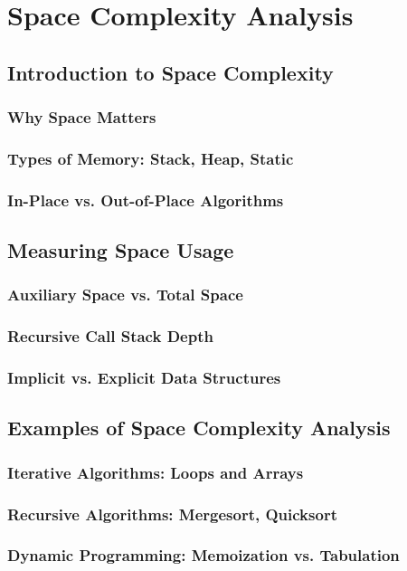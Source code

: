 
\chapter{Space Complexity Analysis}
\section{Introduction to Space Complexity}
\subsection{Why Space Matters}
\subsection{Types of Memory: Stack, Heap, Static}
\subsection{In-Place vs. Out-of-Place Algorithms}

\section{Measuring Space Usage}
\subsection{Auxiliary Space vs. Total Space}
\subsection{Recursive Call Stack Depth}
\subsection{Implicit vs. Explicit Data Structures}

\section{Examples of Space Complexity Analysis}
\subsection{Iterative Algorithms: Loops and Arrays}
\subsection{Recursive Algorithms: Mergesort, Quicksort}
\subsection{Dynamic Programming: Memoization vs. Tabulation}

